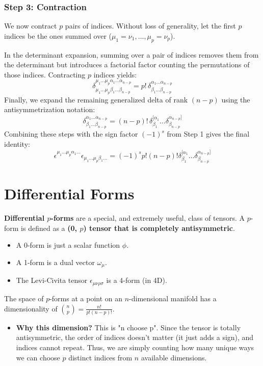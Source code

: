 \documentclass[11pt, a4paper]{report}
\begin{document}
\subsubsection*{Step 3: Contraction}
We now contract $p$ pairs of indices. Without loss of generality, let the first $p$ indices be the ones summed over ($\mu_1=\nu_1, \dots, \mu_p=\nu_p$). 

In the determinant expansion, summing over a pair of indices removes them from the determinant but introduces a factorial factor counting the permutations of those indices. Contracting $p$ indices yields:
\begin{equation}
    \delta^{\mu_1\dots\mu_p \alpha_1 \dots \alpha_{n-p}}_{\mu_1\dots\mu_p \beta_1 \dots \beta_{n-p}} = p! \, \delta^{\alpha_1 \dots \alpha_{n-p}}_{\beta_1 \dots \beta_{n-p}}
\end{equation}
Finally, we expand the remaining generalized delta of rank $(n-p)$ using the antisymmetrization notation:
\begin{equation}
    \delta^{\alpha_1 \dots \alpha_{n-p}}_{\beta_1 \dots \beta_{n-p}} = (n-p)! \, \delta^{[\alpha_1}_{\beta_1} \dots \delta^{\alpha_{n-p}]}_{\beta_{n-p}}
\end{equation}
Combining these steps with the sign factor $(-1)^s$ from Step 1 gives the final identity:
\begin{equation}
    \epsilon^{\mu_1\dots\mu_p\alpha_1\dots} \epsilon_{\mu_1\dots\mu_p\beta_1\dots} = (-1)^s p! (n-p)! \delta^{[\alpha_1}_{\beta_1} \dots \delta^{\alpha_{n-p}]}_{\beta_{n-p}}
\end{equation}
\section{Differential Forms}

\textbf{Differential $p$-forms} are a special, and extremely useful, class of tensors. A $p$-form is defined as a \textbf{(0, $p$) tensor that is completely antisymmetric}.
\begin{itemize}
    \item A 0-form is just a scalar function $\phi$.
    \item A 1-form is a dual vector $\omega_\mu$.
    \item The Levi-Civita tensor $\epsilon_{\mu\nu\rho\sigma}$ is a 4-form (in 4D).
\end{itemize}
The space of $p$-forms at a point on an $n$-dimensional manifold has a dimensionality of $\binom{n}{p} = \frac{n!}{p!(n-p)!}$.
\begin{itemize}
    \item \textbf{Why this dimension?} This is "n choose p". Since the tensor is totally antisymmetric, the order of indices doesn't matter (it just adds a sign), and indices cannot repeat. Thus, we are simply counting how many unique ways we can choose $p$ distinct indices from $n$ available dimensions.
\end{itemize}
\end{document}
